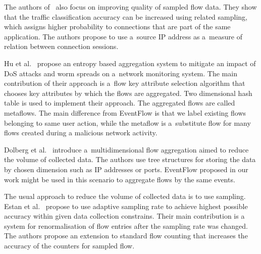 The authors of~\cite{Lee-2015-Flow} also focus on improving quality of sampled flow data. They show that the traffic classification accuracy can be increased using related sampling, which assigns higher probability to connections that are part of the same application. The authors propose to use a~source IP address as a~measure of relation between connection sessions.

Hu et al.~\cite{Hu-2009-Entropy} propose an entropy based aggregation system to mitigate an impact of DoS attacks and worm spreads on a~network monitoring system. The main contribution of their approach is a~flow key attribute selection algorithm that chooses key attributes by which the flows are aggregated. Two dimensional hash table is used to implement their approach. The aggregated flows are called metaflows. The main difference from EventFlow is that we label existing flows belonging to same user action, while the metaflow is a~substitute flow for many flows created during a malicious network activity.

Dolberg et al.~\cite{Dolberg-2012-Efficient} introduce a~multidimensional flow aggregation aimed to reduce the volume of collected data. The authors use tree structures for storing the data by chosen dimension such as IP addresses or ports. EventFlow proposed in our work might be used in this scenario to aggregate flows by the same events.

The usual approach to reduce the volume of collected data is to use sampling. Estan et al.~\cite{Estan-2004-Building} propose to use adaptive sampling rate to achieve highest possible accuracy within given data collection constrains. Their main contribution is a system for renormalisation of flow entries after the sampling rate was changed. The authors propose an extension to standard flow counting that increases the accuracy of the counters for sampled flow.


